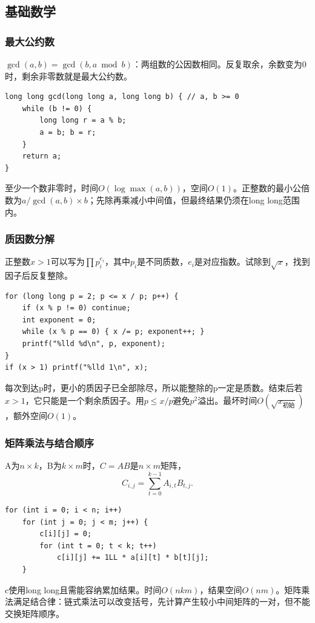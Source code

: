 \documentclass[UTF8,11pt,a4paper,fontset=none]{ctexart}
\begin{document}
\subsection{基础数学}
\subsubsection{最大公约数}
$\gcd(a,b)=\gcd(b,a\bmod b)$：两组数的公因数相同。反复取余，余数变为0时，剩余非零数就是最大公约数。
\par\noindent\begin{minipage}{\linewidth}
\begin{lstlisting}
long long gcd(long long a, long long b) { // a, b >= 0
    while (b != 0) {
        long long r = a % b;
        a = b; b = r;
    }
    return a;
}
\end{lstlisting}
\end{minipage}\par
至少一个数非零时，时间$O(\log\max(a,b))$，空间$O(1)$。正整数的最小公倍数为$a/\gcd(a,b)\times b$；先除再乘减小中间值，但最终结果仍须在long long范围内。
\subsubsection{质因数分解}
正整数$x>1$可以写为$\prod p_i^{e_i}$，其中$p_i$是不同质数，$e_i$是对应指数。试除到$\sqrt{x}$，找到因子后反复整除。
\par\noindent\begin{minipage}{\linewidth}
\begin{lstlisting}
for (long long p = 2; p <= x / p; p++) {
    if (x % p != 0) continue;
    int exponent = 0;
    while (x % p == 0) { x /= p; exponent++; }
    printf("%lld %d\n", p, exponent);
}
if (x > 1) printf("%lld 1\n", x);
\end{lstlisting}
\end{minipage}\par
每次到达p时，更小的质因子已全部除尽，所以能整除的p一定是质数。结束后若$x>1$，它只能是一个剩余质因子。用$p\le x/p$避免$p^2$溢出。最坏时间$O(\sqrt{x_{\text{初始}}})$，额外空间$O(1)$。
\subsubsection{矩阵乘法与结合顺序}
A为$n\times k$，B为$k\times m$时，$C=AB$是$n\times m$矩阵，
\[
C_{i,j}=\sum_{t=0}^{k-1}A_{i,t}B_{t,j}.
\]
\par\noindent\begin{minipage}{\linewidth}
\begin{lstlisting}
for (int i = 0; i < n; i++)
    for (int j = 0; j < m; j++) {
        c[i][j] = 0;
        for (int t = 0; t < k; t++)
            c[i][j] += 1LL * a[i][t] * b[t][j];
    }
\end{lstlisting}
\end{minipage}\par
c使用long long且需能容纳累加结果。时间$O(nkm)$，结果空间$O(nm)$。矩阵乘法满足结合律：链式乘法可以改变括号，先计算产生较小中间矩阵的一对，但不能交换矩阵顺序。
\end{document}
